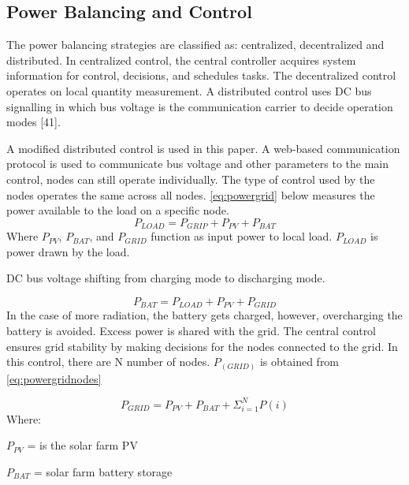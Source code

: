 \subsection{Power Balancing and Control}
The power balancing strategies are classified as: centralized, decentralized and distributed. In centralized control, the central controller acquires system information for control, decisions, and schedules tasks. The decentralized control operates on local quantity measurement. A distributed control uses DC bus signalling in which bus voltage is the communication carrier to decide operation modes [41].\par
A modified distributed control is used in this paper. A web-based communication protocol is used to communicate bus voltage and other parameters to the main control, nodes can still operate individually.
The type of control used by the nodes operates the same across all nodes. \autoref{eq:powergrid} below measures the power available to the load on a specific node.
\begin{equation}
	\label{eq:powergrid}
	{P_{LOAD} = P_{GRIP}+P_{PV}+P_{BAT}}
\end{equation}
Where ${P_{PV}}$, ${P_{BAT}}$, and ${P_{GRID}}$ function as input power to local load. ${P_{LOAD}}$ is power drawn by the load.\par
DC bus voltage shifting from charging mode to discharging mode.\par
\begin{equation}
	{P_{BAT} = P_{LOAD}+P_{PV}+P_{GRID}}
\end{equation}
In the case of more radiation, the battery gets charged, however, overcharging the battery is avoided. Excess power is shared with the grid. The central control ensures grid stability by making decisions for the nodes connected to the grid. In this control, there are N number of nodes. $P_(GRID )$ is obtained from \autoref{eq:powergridnodes}\par
\begin{equation}
	\label{eq:powergridnodes}
	{P_{GRID} = P_{PV}+P_{BAT}+\Sigma^N_{i=1}P(i)}
\end{equation}
Where:
\begin{list}{}{}
	\setlength\itemsep{-1em}
	\item $P_{PV}$ = is the solar farm PV
	\item $P_{BAT}$ =  solar farm battery storage
\end{list}
